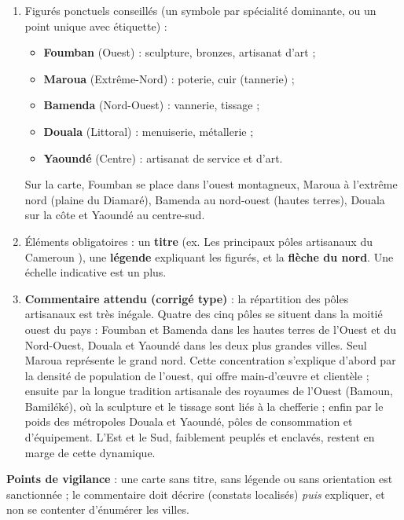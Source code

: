 \documentclass[11pt]{article}
\begin{document}
\begin{corrige}
\begin{enumerate}
\item Figurés ponctuels conseillés (un symbole par spécialité dominante, ou un point unique avec étiquette) :
\begin{itemize}
\item \textbf{Foumban} (Ouest) : sculpture, bronzes, artisanat d'art ;
\item \textbf{Maroua} (Extrême-Nord) : poterie, cuir (tannerie) ;
\item \textbf{Bamenda} (Nord-Ouest) : vannerie, tissage ;
\item \textbf{Douala} (Littoral) : menuiserie, métallerie ;
\item \textbf{Yaoundé} (Centre) : artisanat de service et d'art.
\end{itemize}
Sur la carte, Foumban se place dans l'ouest montagneux, Maroua à l'extrême nord (plaine du Diamaré), Bamenda au nord-ouest (hautes terres), Douala sur la côte et Yaoundé au centre-sud.
\item Éléments obligatoires : un \textbf{titre} (ex. \og Les principaux pôles artisanaux du Cameroun \fg), une \textbf{légende} expliquant les figurés, et la \textbf{flèche du nord}. Une échelle indicative est un plus.
\item \textbf{Commentaire attendu (corrigé type)} : la répartition des pôles artisanaux est très inégale. Quatre des cinq pôles se situent dans la moitié ouest du pays : Foumban et Bamenda dans les hautes terres de l'Ouest et du Nord-Ouest, Douala et Yaoundé dans les deux plus grandes villes. Seul Maroua représente le grand nord. Cette concentration s'explique d'abord par la densité de population de l'ouest, qui offre main-d'œuvre et clientèle ; ensuite par la longue tradition artisanale des royaumes de l'Ouest (Bamoun, Bamiléké), où la sculpture et le tissage sont liés à la chefferie ; enfin par le poids des métropoles Douala et Yaoundé, pôles de consommation et d'équipement. L'Est et le Sud, faiblement peuplés et enclavés, restent en marge de cette dynamique.
\end{enumerate}
\textbf{Points de vigilance} : une carte sans titre, sans légende ou sans orientation est sanctionnée ; le commentaire doit décrire (constats localisés) \emph{puis} expliquer, et non se contenter d'énumérer les villes.
\end{corrige}
\end{document}
